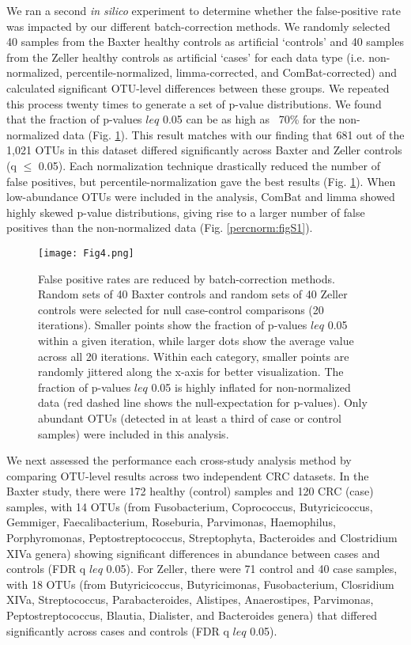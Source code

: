 We ran a second \textit{in silico} experiment to determine whether the false-positive rate was impacted by our different batch-correction methods.
We randomly selected 40 samples from the Baxter healthy controls as artificial `controls' and 40 samples from the Zeller healthy controls as artificial `cases' for each data type (i.e. non-normalized, percentile-normalized, limma-corrected, and ComBat-corrected) and calculated significant OTU-level differences between these groups.
We repeated this process twenty times to generate a set of p-value distributions.
We found that the fraction of p-values $leq$ 0.05 can be as high as ~70\% for the non-normalized data (Fig. \ref{percnorm:fig4}).
This result matches with our finding that 681 out of the 1,021 OTUs in this dataset differed significantly across Baxter and Zeller controls (q $\leq$ 0.05).
Each normalization technique drastically reduced the number of false positives, but percentile-normalization gave the best results (Fig. \ref{percnorm:fig4}).
When low-abundance OTUs were included in the analysis, ComBat and limma showed highly skewed p-value distributions, giving rise to a larger number of false positives than the non-normalized data (Fig. \ref{percnorm:figS1}).

\begin{figure}[h]
\begin{center}
    \texttt{[image: Fig4.png]}
    \caption{False positive rates are reduced by batch-correction methods. Random sets of 40 Baxter controls and random sets of 40 Zeller controls were selected for null case-control comparisons (20 iterations). Smaller points show the fraction of p-values $leq$ 0.05 within a given iteration, while larger dots show the average value across all 20 iterations. Within each category, smaller points are randomly jittered along the x-axis for better visualization. The fraction of p-values $leq$ 0.05 is highly inflated for non-normalized data (red dashed line shows the null-expectation for p-values). Only abundant OTUs (detected in at least a third of case or control samples) were included in this analysis.}\label{percnorm:fig4}
\end{center}
\end{figure}

We next assessed the performance each cross-study analysis method by comparing OTU-level results across two independent CRC datasets.
In the Baxter study, there were 172 healthy (control) samples and 120 CRC (case) samples, with 14 OTUs (from Fusobacterium, Coprococcus, Butyricicoccus, Gemmiger, Faecalibacterium, Roseburia, Parvimonas, Haemophilus, Porphyromonas, Peptostreptococcus, Streptophyta, Bacteroides and Clostridium XIVa genera) showing significant differences in abundance between cases and controls (FDR q $leq$ 0.05).
For Zeller, there were 71 control and 40 case samples, with 18 OTUs (from Butyricicoccus, Butyricimonas, Fusobacterium, Closridium XIVa, Streptococcus, Parabacteroides, Alistipes, Anaerostipes, Parvimonas, Peptostreptococcus, Blautia, Dialister, and Bacteroides genera) that differed significantly across cases and controls (FDR q $leq$ 0.05).


